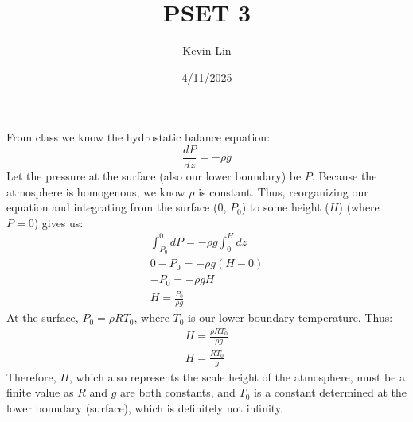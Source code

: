 \documentclass[11pt,a4paper,margin=1in]{article}
\title{PSET 3}
\author{Kevin Lin}
\date{4/11/2025}
\begin{document}
\maketitle
\section{}
From class we know the hydrostatic balance equation:
\[
    \frac{dP}{dz} = -\rho g
\]
Let the pressure at the surface (also our lower boundary) be $P$. Because the
atmosphere is homogenous, we know $\rho$ is constant. Thus, reorganizing our
equation and integrating from the surface (0, $P_0$) to some height ($H$) (where
$P = 0$) gives us:
\begin{gather*}
    \int_{P_0}^{0} dP = -\rho g \int_{0}^{H}  dz\\
    0 - P_0 = -\rho g (H - 0)\\
    -P_0 = -\rho g H\\
    H = \frac{P_0}{\rho g}
\end{gather*}
At the surface, $P_0 = \rho R T_0$, where $T_0$ is our lower boundary temperature.
Thus:
\begin{gather*}
    H = \frac{\rho R T_0}{\rho g}\\
    H = \frac{R T_0}{g}
\end{gather*}
Therefore, $H$, which also represents the scale height of the atmosphere, must
be a finite value as $R$ and $g$ are both constants, and $T_0$ is a constant
determined at the lower boundary (surface), which is definitely not infinity.
\end{document}
